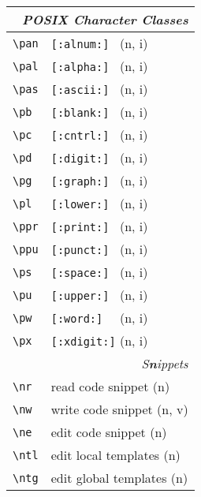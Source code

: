 \documentclass[oneside,12pt,a4paper,DIV18]{scrartcl}
\begin{document}
\begin{center}
\newpage 
\begin{tabular}[]{|p{11mm}|p{59mm}|}
\hline
\multicolumn{2}{|r|}{\textsl{\textbf{P}OSIX Character Classes}}\\
\hline \verb'\pan' &  \verb'[:alnum:] '         \hfill (n, i)\\
\hline \verb'\pal' &  \verb'[:alpha:] '         \hfill (n, i)\\
\hline \verb'\pas' &  \verb'[:ascii:] '         \hfill (n, i)\\
\hline \verb'\pb'  &  \verb'[:blank:] '         \hfill (n, i)\\
\hline \verb'\pc'  &  \verb'[:cntrl:] '         \hfill (n, i)\\
\hline \verb'\pd'  &  \verb'[:digit:] '         \hfill (n, i)\\
\hline \verb'\pg'  &  \verb'[:graph:] '         \hfill (n, i)\\
\hline \verb'\pl'  &  \verb'[:lower:] '         \hfill (n, i)\\
\hline \verb'\ppr' &  \verb'[:print:] '         \hfill (n, i)\\
\hline \verb'\ppu' &  \verb'[:punct:] '         \hfill (n, i)\\
\hline \verb'\ps'  &  \verb'[:space:] '         \hfill (n, i)\\
\hline \verb'\pu'  &  \verb'[:upper:] '         \hfill (n, i)\\
\hline \verb'\pw'  &  \verb'[:word:]  '         \hfill (n, i)\\
\hline \verb'\px'  &  \verb'[:xdigit:]'         \hfill (n, i)\\
\hline
\hline
\multicolumn{2}{|r|}{\textsl{S\textbf{n}ippets}}\\
\hline \verb'\nr'  & read code snippet          \hfill (n)\\
\hline \verb'\nw'  & write code snippet         \hfill (n, v)\\
\hline \verb'\ne'  & edit code snippet          \hfill (n)\\
%
\hline \verb'\ntl' & edit local templates      \hfill (n)\\
\hline \verb'\ntg' & edit global templates     \hfill (n)\\

\end{tabular}
\end{center}
\end{document}
